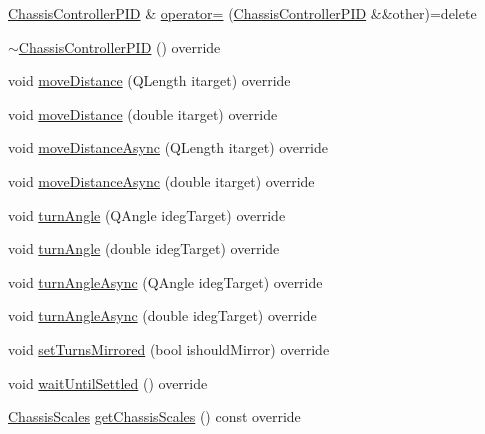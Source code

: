 \begin{DoxyCompactItemize}
\item 
\mbox{\hyperlink{classokapi_1_1ChassisControllerPID}{Chassis\+Controller\+P\+ID}} \& \mbox{\hyperlink{classokapi_1_1ChassisControllerPID_a395bac44038870d7aeae2a950e675617}{operator=}} (\mbox{\hyperlink{classokapi_1_1ChassisControllerPID}{Chassis\+Controller\+P\+ID}} \&\&other)=delete
\item 
\mbox{\hyperlink{classokapi_1_1ChassisControllerPID_a89f64eec355595eaa2631305805efdb5}{$\sim$\+Chassis\+Controller\+P\+ID}} () override
\item 
void \mbox{\hyperlink{classokapi_1_1ChassisControllerPID_ab5f0409c6add9b1c3b176b61643de067}{move\+Distance}} (Q\+Length itarget) override
\item 
void \mbox{\hyperlink{classokapi_1_1ChassisControllerPID_a711b80afa09a80233372cc37267606d5}{move\+Distance}} (double itarget) override
\item 
void \mbox{\hyperlink{classokapi_1_1ChassisControllerPID_affad4aa1b0bd54db728ac600493a6c4c}{move\+Distance\+Async}} (Q\+Length itarget) override
\item 
void \mbox{\hyperlink{classokapi_1_1ChassisControllerPID_a7a13b5cd2fe7bce73cf0e3a3144fe6db}{move\+Distance\+Async}} (double itarget) override
\item 
void \mbox{\hyperlink{classokapi_1_1ChassisControllerPID_a56aae5a15daa9ed81963dd48fce69535}{turn\+Angle}} (Q\+Angle ideg\+Target) override
\item 
void \mbox{\hyperlink{classokapi_1_1ChassisControllerPID_a140679da584fdc8bd057678e277742e7}{turn\+Angle}} (double ideg\+Target) override
\item 
void \mbox{\hyperlink{classokapi_1_1ChassisControllerPID_a391c12c7b3cb5461cd28c4aebc4aeab0}{turn\+Angle\+Async}} (Q\+Angle ideg\+Target) override
\item 
void \mbox{\hyperlink{classokapi_1_1ChassisControllerPID_a3a16a11e8b0e11dbfb2a03b5685e509b}{turn\+Angle\+Async}} (double ideg\+Target) override
\item 
void \mbox{\hyperlink{classokapi_1_1ChassisControllerPID_a1e68419f6e695fd35576a6d886618741}{set\+Turns\+Mirrored}} (bool ishould\+Mirror) override
\item 
void \mbox{\hyperlink{classokapi_1_1ChassisControllerPID_a964cc8132bfa76492df0ee06aadb255a}{wait\+Until\+Settled}} () override
\item 
\mbox{\hyperlink{classokapi_1_1ChassisScales}{Chassis\+Scales}} \mbox{\hyperlink{classokapi_1_1ChassisControllerPID_a75f4e1b26f2440ac4066fd740dee7b13}{get\+Chassis\+Scales}} () const override

\end{DoxyCompactItemize}
